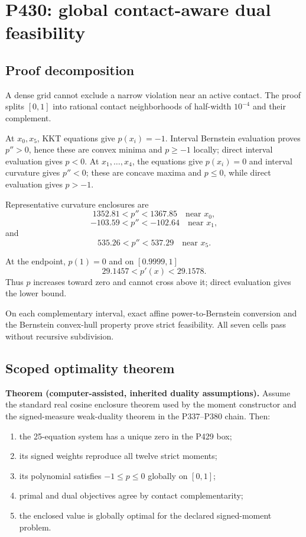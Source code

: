 \documentclass[11pt,a4paper]{article}
\begin{document}
\section{P430: global contact-aware dual feasibility}

\subsection{Proof decomposition}

A dense grid cannot exclude a narrow violation near an active contact. The
proof splits $[0,1]$ into rational contact neighborhoods of half-width
$10^{-4}$ and their complement.

At $x_0,x_5$, KKT equations give $p(x_i)=-1$. Interval Bernstein evaluation
proves $p''>0$, hence these are convex minima and $p\ge-1$ locally; direct
interval evaluation gives $p<0$. At $x_1,\ldots,x_4$, the equations give
$p(x_i)=0$ and interval curvature gives $p''<0$; these are concave maxima and
$p\le0$, while direct evaluation gives $p>-1$.

Representative curvature enclosures are
\[
1352.81<p''<1367.85\quad\text{near }x_0,
\]
\[
-103.59<p''<-102.64\quad\text{near }x_1,
\]
and
\[
535.26<p''<537.29\quad\text{near }x_5.
\]

At the endpoint, $p(1)=0$ and on $[0.9999,1]$
\[
29.1457<p'(x)<29.1578.
\]
Thus $p$ increases toward zero and cannot cross above it; direct evaluation
gives the lower bound.

On each complementary interval, exact affine power-to-Bernstein conversion
and the Bernstein convex-hull property prove strict feasibility. All seven
cells pass without recursive subdivision.

\subsection{Scoped optimality theorem}

\textbf{Theorem (computer-assisted, inherited duality assumptions).}
Assume the standard real cosine enclosure theorem used by the moment
constructor and the signed-measure weak-duality theorem in the P337--P380
chain. Then:
\begin{enumerate}
\item the 25-equation system has a unique zero in the P429 box;
\item its signed weights reproduce all twelve strict moments;
\item its polynomial satisfies $-1\le p\le0$ globally on $[0,1]$;
\item primal and dual objectives agree by contact complementarity;
\item the enclosed value is globally optimal for the declared signed-moment
problem.
\end{enumerate}
\end{document}
